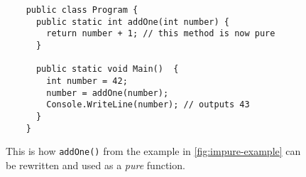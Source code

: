 \documentclass[a4paper,12pt]{article}
\begin{document}
\begin{figure}[H]
  \centering
  \begin{lstlisting}
    public class Program {
      public static int addOne(int number) {
        return number + 1; // this method is now pure
      }

      public static void Main()  {
        int number = 42;
        number = addOne(number);
        Console.WriteLine(number); // outputs 43
      }
    }
  \end{lstlisting}
  \caption{This is how \texttt{addOne()} from the example in \autoref{fig:impure-example} can be rewritten and used as a \textit{pure} function.}
  \label{fig:pure-example}
\end{figure}


\end{document}
